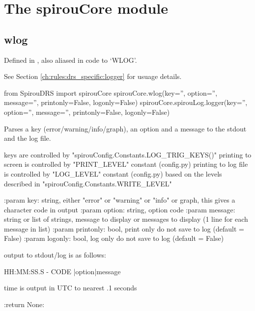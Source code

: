 
\clearpage
\newpage
\noindent\begin{minipage}{\textwidth}
\section{The spirouCore module}
\label{ch:the_module:spirouCore}

\subsection{wlog}
\label{ch:the_module:spirouCore:logger}

Defined in \spirouCore{}, also aliased in code to `WLOG'.

See Section \ref{ch:rules:drs_specific:logger} for usuage details.

\begin{pythonbox}
from SpirouDRS import spirouCore
spirouCore.wlog(key='', option='', message='', printonly=False, logonly=False)
spirouCore.spirouLog.logger(key='', option='', message='', printonly=False, logonly=False)
\end{pythonbox}

\begin{pythondocstring}
Parses a key (error/warning/info/graph), an option and a message to the
stdout and the log file.

keys are controlled by "spirouConfig.Constants.LOG_TRIG_KEYS()"
printing to screen is controlled by "PRINT_LEVEL" constant (config.py)
printing to log file is controlled by "LOG_LEVEL" constant (config.py)
based on the levels described in "spirouConfig.Constants.WRITE_LEVEL"

:param key: string, either "error" or "warning" or "info" or graph, this
            gives a character code in output
:param option: string, option code
:param message: string or list of strings, message to display or messages
                to display (1 line for each message in list)
:param printonly: bool, print only do not save to log (default = False)
:param logonly: bool, log only do not save to log (default = False)

output to stdout/log is as follows:

    HH:MM:SS.S - CODE |option|message

time is output in UTC to nearest .1 seconds

:return None:
\end{pythondocstring}
\end{minipage}


